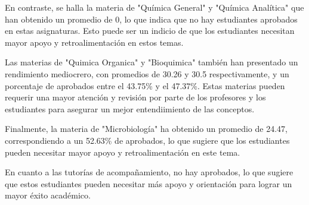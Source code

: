 En contraste, se halla la materia de "Química General" y "Química Analítica" que han obtenido un promedio de 0, lo que indica que no hay estudiantes aprobados en estas asignaturas. Esto puede ser un indicio de que los estudiantes necesitan mayor apoyo y retroalimentación en estos temas.

Las materias de "Quimica Organica" y "Bioquimica" también han presentado un rendimiento mediocrero, con promedios de 30.26 y 30.5 respectivamente, y un porcentaje de aprobados entre el 43.75\% y el 47.37\%. Estas materias pueden requerir una mayor atención y revisión por parte de los profesores y los estudiantes para asegurar un mejor entendiimiento de las conceptos.

Finalmente, la materia de "Microbiología" ha obtenido un promedio de 24.47, correspondiendo a un 52.63\% de aprobados, lo que sugiere que los estudiantes pueden necesitar mayor apoyo y retroalimentación en este tema.

En cuanto a las tutorías de acompañamiento, no hay aprobados, lo que sugiere que estos estudiantes pueden necesitar más apoyo y orientación para lograr un mayor éxito académico.

